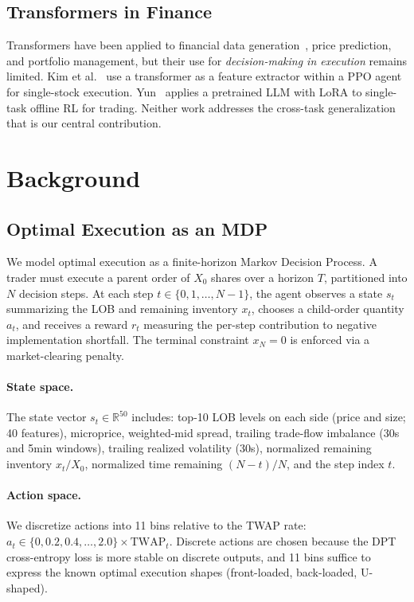 \documentclass[sigconf,review,anonymous]{acmart}
\newcommand{\R}{\mathbb{R}}
\newcommand{\twap}{\text{TWAP}}
\begin{document}
\subsection{Transformers in Finance}

Transformers have been applied to financial data generation~\cite{cont2025limit, sokolov2023diffusion}, price prediction, and portfolio management, but their use for \emph{decision-making in execution} remains limited.
Kim et al.~\cite{kim2024adaptive} use a transformer as a feature extractor within a PPO agent for single-stock execution.
Yun~\cite{yun2024pretrained} applies a pretrained LLM with LoRA to single-task offline RL for trading.
Neither work addresses the cross-task generalization that is our central contribution.


\section{Background}\label{sec:background}

\subsection{Optimal Execution as an MDP}

We model optimal execution as a finite-horizon Markov Decision Process.
A trader must execute a parent order of $X_0$ shares over a horizon $T$, partitioned into $N$ decision steps.
At each step $t \in \{0, 1, \ldots, N{-}1\}$, the agent observes a state $s_t$ summarizing the LOB and remaining inventory $x_t$, chooses a child-order quantity $a_t$, and receives a reward $r_t$ measuring the per-step contribution to negative implementation shortfall.
The terminal constraint $x_N = 0$ is enforced via a market-clearing penalty.

\paragraph{State space.}
The state vector $s_t \in \R^{50}$ includes: top-10 LOB levels on each side (price and size; 40 features), microprice, weighted-mid spread, trailing trade-flow imbalance (30s and 5min windows), trailing realized volatility (30s), normalized remaining inventory $x_t / X_0$, normalized time remaining $(N{-}t)/N$, and the step index $t$.

\paragraph{Action space.}
We discretize actions into 11 bins relative to the TWAP rate: $a_t \in \{0, 0.2, 0.4, \ldots, 2.0\} \times \twap_t$.
Discrete actions are chosen because the DPT cross-entropy loss is more stable on discrete outputs, and 11 bins suffice to express the known optimal execution shapes (front-loaded, back-loaded, U-shaped).
\end{document}
